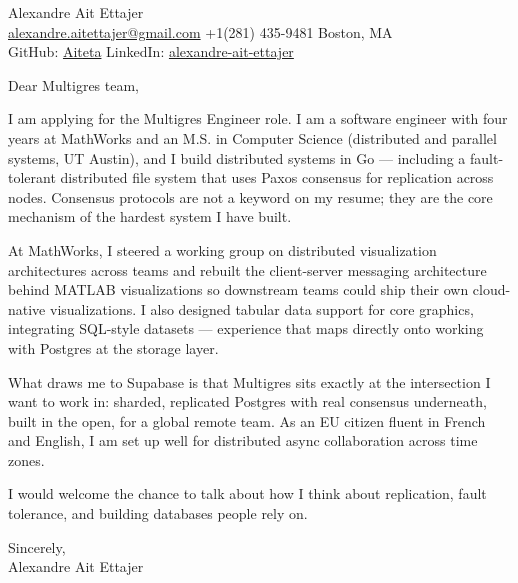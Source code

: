 \documentclass{article}
\begin{document}
\begin{flushleft}
    {\Large Alexandre Ait Ettajer} \\
    \href{mailto:alexandre.aitettajer@gmail.com}{alexandre.aitettajer@gmail.com} \quad +1(281) 435-9481 \quad Boston, MA \\
    GitHub: \href{https://github.com/aiteta}{Aiteta} \quad LinkedIn: \href{https://www.linkedin.com/in/alexandre-ait-ettajer-65740b170/}{alexandre-ait-ettajer}
\end{flushleft}

\vspace{1em}

Dear Multigres team,

I am applying for the Multigres Engineer role. I am a software engineer with four years at MathWorks and an M.S. in Computer Science (distributed and parallel systems, UT Austin), and I build distributed systems in Go — including a fault-tolerant distributed file system that uses Paxos consensus for replication across nodes. Consensus protocols are not a keyword on my resume; they are the core mechanism of the hardest system I have built.

At MathWorks, I steered a working group on distributed visualization architectures across teams and rebuilt the client-server messaging architecture behind MATLAB visualizations so downstream teams could ship their own cloud-native visualizations. I also designed tabular data support for core graphics, integrating SQL-style datasets — experience that maps directly onto working with Postgres at the storage layer.

What draws me to Supabase is that Multigres sits exactly at the intersection I want to work in: sharded, replicated Postgres with real consensus underneath, built in the open, for a global remote team. As an EU citizen fluent in French and English, I am set up well for distributed async collaboration across time zones.

I would welcome the chance to talk about how I think about replication, fault tolerance, and building databases people rely on.

Sincerely, \\
Alexandre Ait Ettajer
\end{document}
